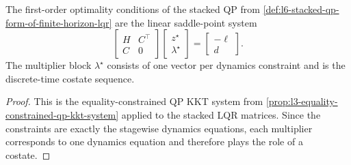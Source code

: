 \begin{proposition}\label{prop:l6-kkt-system-for-stacked-lqr}
	The first-order optimality conditions of the stacked QP from \autoref{def:l6-stacked-qp-form-of-finite-horizon-lqr} are the linear saddle-point system
	\[
		\begin{bmatrix}
			H      & C^\top \\
			C      & 0
		\end{bmatrix}
		\begin{bmatrix}
			z^\star \\
			\lambda^\star
		\end{bmatrix}
		=
		\begin{bmatrix}
			-\ell \\
			d
		\end{bmatrix}.
	\]
	The multiplier block $\lambda^\star$ consists of one vector per dynamics constraint and is the discrete-time costate sequence.
\end{proposition}
\begin{proof}
	This is the equality-constrained QP KKT system from \autoref{prop:l3-equality-constrained-qp-kkt-system} applied to the stacked LQR matrices. Since the constraints are exactly the stagewise dynamics equations, each multiplier corresponds to one dynamics equation and therefore plays the role of a costate.
\end{proof}

